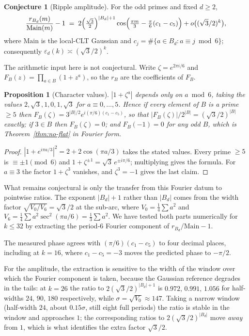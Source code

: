 \documentclass[11pt,a4paper]{article}
\theoremstyle{plain}
\newtheorem{proposition}[theorem]{Proposition}
\theoremstyle{definition}
\newtheorem{conjecture}[theorem]{Conjecture}
\theoremstyle{remark}
\begin{document}
\begin{conjecture}[Ripple amplitude]\label{conj:ripple}
For the odd primes and fixed $d\ge2$,
\[
  \frac{r_{B_d}(m)}{\mathrm{Main}(m)}-1
  \;=\;2\Bigl(\tfrac{\sqrt3}{2}\Bigr)^{|B_d|+1}
        \cos\Bigl(\tfrac{\pi m}{3}-\tfrac{\pi}{6}(c_1-c_5)\Bigr)
        +o\bigl((\sqrt3/2)^{k}\bigr),
\]
where $\mathrm{Main}$ is the local-CLT Gaussian and
$c_j=\#\{a\in B_d: a\equiv j\bmod 6\}$; consequently
$\varepsilon_d(k)\asymp(\sqrt3/2)^{k}$.
\end{conjecture}

The arithmetic input here is not conjectural. Write $\zeta=e^{2\pi i/6}$ and
$F_B(z)=\prod_{a\in B}(1+z^{a})$, so the $r_B$ are the coefficients of $F_B$.

\begin{proposition}[Character values]\label{prop:character}
$|1+\zeta^{a}|$ depends only on $a\bmod6$, taking the values
$2,\sqrt3,1,0,1,\sqrt3$ for $a\equiv0,\dots,5$. Hence if every element of $B$ is
a prime $\ge5$ then $F_B(\zeta)=3^{|B|/2}e^{i(\pi/6)(c_1-c_5)}$, so that
$|F_B(\zeta)|/2^{|B|}=(\sqrt3/2)^{|B|}$ \emph{exactly}; if $3\in B$ then
$F_B(\zeta)=0$; and $F_B(-1)=0$ for any odd $B$, which is
Theorem~\ref{thm:no-flat} in Fourier form.
\end{proposition}

\begin{proof}
$|1+e^{i\pi a/3}|^{2}=2+2\cos(\pi a/3)$ takes the stated values. Every prime
$\ge5$ is $\equiv\pm1\pmod6$ and $1+\zeta^{\pm1}=\sqrt3\,e^{\pm i\pi/6}$;
multiplying gives the formula. For $a\equiv3$ the factor $1+\zeta^{3}$ vanishes,
and $\zeta^{3}=-1$ gives the last claim.
\end{proof}

What remains conjectural is only the transfer from this Fourier datum to
pointwise ratios. The exponent $|B_d|+1$ rather than $|B_d|$ comes from the
width factor $\sqrt{V_0/V_6}=\sqrt3/2$ at the sub-arc, where
$V_0=\tfrac14\sum a^{2}$ and $V_6=\tfrac14\sum a^{2}\sec^{2}(\pi a/6)
=\tfrac13\sum a^{2}$. We have tested both parts numerically for $k\le32$ by
extracting the period-$6$ Fourier component of $r_{B_d}/\mathrm{Main}-1$.

The measured phase agrees with $(\pi/6)(c_1-c_5)$ to four decimal places,
including at $k=16$, where $c_1-c_5=-3$ moves the predicted phase to $-\pi/2$.

For the amplitude, the extraction is sensitive to the width of the window over
which the Fourier component is taken, because the Gaussian reference degrades in
the tails: at $k=26$ the ratio to $2(\sqrt3/2)^{|B_d|+1}$ is
$0.972,\,0.991,\,1.056$ for half-widths $24,\,90,\,180$ respectively, while
$\sigma=\sqrt{V_0}\approx147$. Taking a narrow window (half-width $24$, about
$0.15\sigma$, still eight full periods) the ratio is stable in the window and
approaches $1$; the corresponding ratios to $2(\sqrt3/2)^{|B_d|}$ move
\emph{away} from $1$, which is what identifies the extra factor $\sqrt3/2$.
\end{document}
